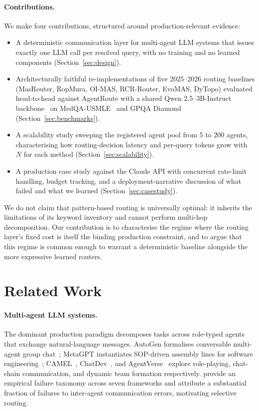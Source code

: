 \documentclass[11pt]{article}
\begin{document}
\paragraph{Contributions.}
We make four contributions, structured around production-relevant evidence:
\begin{itemize}
    \item A deterministic communication layer for multi-agent LLM systems
    that issues exactly one LLM call per resolved query, with no training and
    no learned components (Section~\ref{sec:design}).
    \item Architecturally faithful re-implementations of five 2025--2026
    routing baselines (MasRouter, RopMura, OI-MAS, RCR-Router, EvoMAS, DyTopo)
    evaluated head-to-head against AgentRoute with a shared
    Qwen 2.5--3B-Instruct backbone~\citep{qwen2025} on
    MedQA-USMLE~\citep{jin2021medqa} and
    GPQA Diamond~\citep{rein2024gpqa} (Section~\ref{sec:benchmarks}).
    \item A scalability study sweeping the registered agent pool from 5 to
    200 agents, characterising how routing-decision latency and per-query
    tokens grow with $N$ for each method (Section~\ref{sec:scalability}).
    \item A production case study against the Claude API with concurrent
    rate-limit handling, budget tracking, and a deployment-narrative
    discussion of what failed and what we learned
    (Section~\ref{sec:casestudy}).
\end{itemize}

We do not claim that pattern-based routing is universally optimal: it
inherits the limitations of its keyword inventory and cannot perform
multi-hop decomposition. Our contribution is to characterise the regime
where the routing layer's fixed cost is itself the binding production
constraint, and to argue that this regime is common enough to warrant a
deterministic baseline alongside the more expressive learned routers.

\section{Related Work}
\label{sec:related}

\paragraph{Multi-agent LLM systems.}
The dominant production paradigm decomposes tasks across role-typed agents
that exchange natural-language messages. AutoGen formalises conversable
multi-agent group chat~\citep{wu2023autogen}; MetaGPT instantiates
SOP-driven assembly lines for software
engineering~\citep{hong2024metagpt}; CAMEL~\citep{li2023camel},
ChatDev~\citep{qian2024chatdev}, and AgentVerse~\citep{chen2024agentverse}
explore role-playing, chat-chain communication, and dynamic team formation
respectively. \citet{cemri2025why} provide an empirical failure taxonomy
across seven frameworks and attribute a substantial fraction of failures
to inter-agent communication errors, motivating selective routing.
\end{document}
